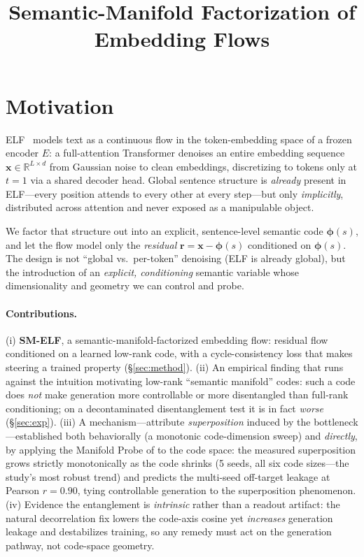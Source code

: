 \documentclass[11pt]{article}
\title{\vspace{-3em}Semantic-Manifold Factorization of Embedding Flows}
\author{}
\date{}
\newcommand{\R}{\mathbb{R}}
\newcommand{\xb}{\bm{x}}
\newcommand{\rb}{\bm{r}}
\newcommand{\phib}{\bm{\phi}}
\begin{document}
\maketitle
\vspace{-3em}

\section{Motivation}

ELF~\cite{elf2026} models text as a continuous flow in the token-embedding space
of a frozen encoder $E$: a full-attention Transformer denoises an entire
embedding sequence $\xb \in \R^{L\times d}$ from Gaussian noise to clean
embeddings, discretizing to tokens only at $t{=}1$ via a shared decoder head.
Global sentence structure is \emph{already} present in ELF---every position
attends to every other at every step---but only \emph{implicitly}, distributed
across attention and never exposed as a manipulable object.

We factor that structure out into an explicit, sentence-level semantic code
$\phib(s)$, and let the flow model only the \emph{residual} $\rb=\xb-\phib(s)$
conditioned on $\phib(s)$. The design is not ``global vs.\ per-token'' denoising
(ELF is already global), but the introduction of an \emph{explicit, conditioning}
semantic variable whose dimensionality and geometry we can control and probe.

\paragraph{Contributions.} (i) \textbf{SM-ELF}, a semantic-manifold-factorized
embedding flow: residual flow conditioned on a learned low-rank code, with a
cycle-consistency loss that makes steering a trained property
(\S\ref{sec:method}). (ii) An empirical finding that runs against the intuition
motivating low-rank ``semantic manifold'' codes: such a code does \emph{not} make
generation more controllable or more disentangled than full-rank conditioning;
on a decontaminated disentanglement test it is in fact \emph{worse}
(\S\ref{sec:exp}). (iii) A mechanism---attribute \emph{superposition} induced by
the bottleneck---established both behaviorally (a monotonic code-dimension sweep)
and \emph{directly}, by applying the Manifold Probe of \cite{manifold2026} to the
code space: the measured superposition grows strictly monotonically as the code
shrinks (5 seeds, all six code sizes---the study's most robust trend) and predicts
the multi-seed off-target leakage at Pearson $r{=}0.90$, tying controllable
generation to the superposition phenomenon. (iv) Evidence the entanglement is
\emph{intrinsic} rather than a readout artifact: the natural decorrelation fix
lowers the code-axis cosine yet \emph{increases} generation leakage and
destabilizes training, so any remedy must act on the generation pathway, not
code-space geometry.
\end{document}
